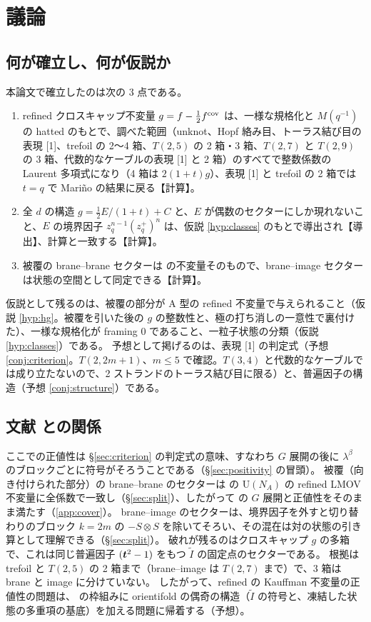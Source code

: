 \section{議論}\label{sec:discussion}

\subsection{何が確立し、何が仮説か}
本論文で確立したのは次の 3 点である。
\begin{enumerate}
\item refined クロスキャップ不変量 $g = f - \tfrac12 f^{\mathrm{cov}}$ は、一様な規格化と $M(q^{-1})$ の hatted のもとで、調べた範囲（unknot、Hopf 絡み目、トーラス結び目の表現 [1]、trefoil の 2〜4 箱、$T(2,5)$ の 2 箱・3 箱、$T(2,7)$ と $T(2,9)$ の 3 箱、代数的なケーブルの表現 [1] と 2 箱）のすべてで整数係数の Laurent 多項式になり（4 箱は $2(1+t)g$）、表現 [1] と trefoil の 2 箱では $t = q$ で Mariño の結果に戻る【計算】。
\item 全 $d$ の構造 $g = \tfrac12 E/(1+t) + C$ と、$E$ が偶数のセクターにしか現れないこと、$E$ の境界因子 $z_q^{n-1}(z_q^+)^n$ は、仮説 \ref{hyp:classes} のもとで導出され【導出】、計算と一致する【計算】。
\item 被覆の brane--brane セクターは \cite{KN17} の不変量そのもので、brane--image セクターは状態の空間として同定できる【計算】。
\end{enumerate}
仮説として残るのは、被覆の部分が A 型の refined 不変量で与えられること（仮説 \ref{hyp:hg}。被覆を引いた後の $g$ の整数性と、極の打ち消しの一意性で裏付けた）、一様な規格化が framing 0 であること、一粒子状態の分類（仮説 \ref{hyp:classes}）である。
予想として掲げるのは、表現 [1] の判定式（予想 \ref{conj:criterion}。$T(2,2m+1)$、$m \le 5$ で確認。$T(3,4)$ と代数的なケーブルでは成り立たないので、2 ストランドのトーラス結び目に限る）と、普遍因子の構造（予想 \ref{conj:structure}）である。

\subsection{文献 \texorpdfstring{\cite{KN17}}{[KN17]} との関係}\label{sec:kn}
ここでの正値性は §\ref{sec:criterion} の判定式の意味、すなわち $G$ 展開の後に $\lambda^\beta$ のブロックごとに符号がそろうことである（§\ref{sec:positivity} の冒頭）。
被覆（向き付けられた部分）の brane--brane のセクターは \cite{KN17} の U$(N_A)$ の refined LMOV 不変量に全係数で一致し（§\ref{sec:split}）、したがって \cite{KN17} の $G$ 展開と正値性をそのまま満たす（\ref{app:cover}）。
brane--image のセクターは、境界因子を外すと切り替わりのブロック $k = 2m$ の $-S\otimes S$ を除いてそろい、その混在は対の状態の引き算として理解できる（§\ref{sec:split}）。
破れが残るのはクロスキャップ $g$ の多箱で、これは同じ普遍因子 $(\bm{t}^2 - 1)$ をもつ $\tilde I$ の固定点のセクターである。
根拠は trefoil と $T(2,5)$ の 2 箱まで（brane--image は $T(2,7)$ まで）で、3 箱は brane と image に分けていない。
したがって、refined の Kauffman 不変量の正値性の問題は、\cite{KN17} の枠組みに orientifold の偶奇の構造（$\tilde I$ の符号と、凍結した状態の多重項の基底）を加える問題に帰着する（予想）。

